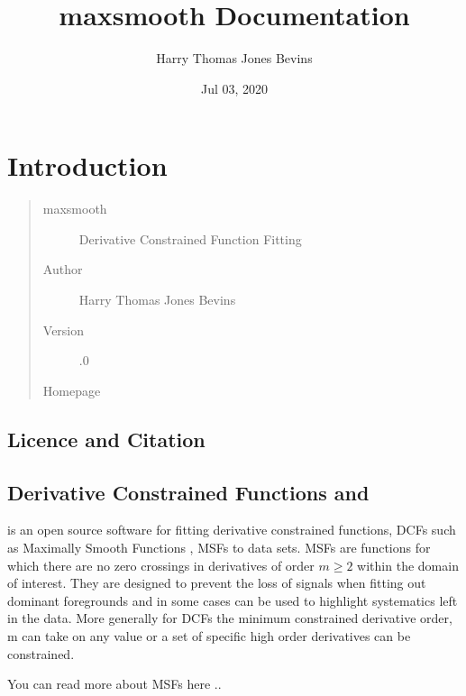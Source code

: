 \documentclass[letterpaper,10pt,english]{sphinxmanual}
\title{maxsmooth Documentation}
\date{Jul 03, 2020}
\author{Harry Thomas Jones Bevins}
\begin{document}
\pagestyle{empty}
\sphinxmaketitle
\pagestyle{plain}
\sphinxtableofcontents
\pagestyle{normal}
\label{\detokenize{source/index::doc}}



\chapter{Introduction}
\label{\detokenize{source/intro:introduction}}\begin{quote}\begin{description}
\item[{maxsmooth}] \leavevmode
Derivative Constrained Function Fitting

\item[{Author}] \leavevmode
Harry Thomas Jones Bevins

\item[{Version}] .0

\item[{Homepage}] \leavevmode
{}

\end{description}\end{quote}


\section{Licence and Citation}
\label{\detokenize{source/intro:licence-and-citation}}

\section{Derivative Constrained Functions and }
\label{\detokenize{source/intro:derivative-constrained-functions-and-maxsmooth}}
 is an open source software for fitting derivative constrained
functions, DCFs such as Maximally Smooth Functions
, MSFs to data sets. MSFs are functions for which there are no zero
crossings in derivatives of order \(m \geq 2\) within the domain of interest.
They are designed to prevent the loss of
signals when fitting out dominant foregrounds and in some cases can be used to
highlight systematics left in the data. More generally for DCFs the minimum
constrained derivative order, m can take on any value or a set of
specific high order derivatives can be constrained.

You can read more about MSFs here ..
\end{document}
